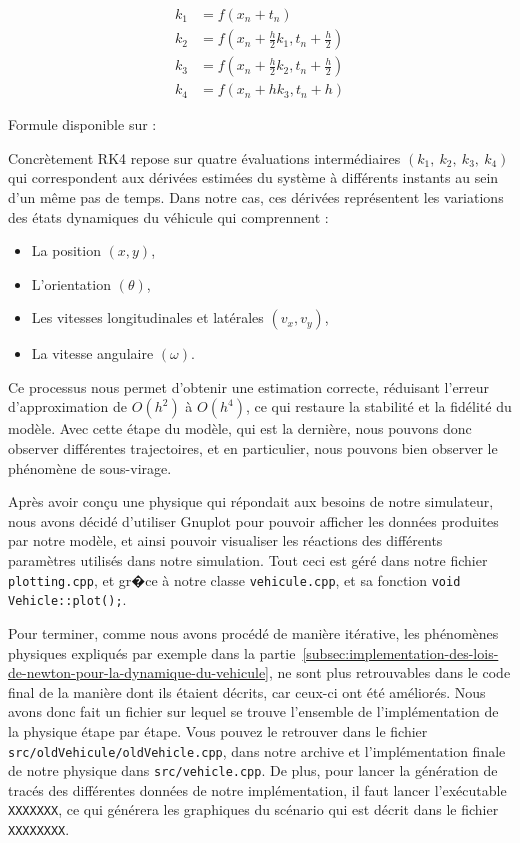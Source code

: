 \begin{align}
    k_1 &= f(x_n+t_n)\\
    k_2 &= f(x_n+ {\frac{h}{2}}k_1, t_n + {\frac{h}{2}})\\
    k_3 &= f(x_n+ {\frac{h}{2}}k_2, t_n + {\frac{h}{2}})\\
    k_4 &= f(x_n+ hk_3, t_n + h)
\end{align}
\begin{center}
    Formule disponible sur : \cite{RK4}
\end{center}
Concrètement RK4 repose sur quatre évaluations intermédiaires $(k_1, \ k_2, \ k_3, \ k_4)$ qui correspondent aux
dérivées estimées du système à différents instants au sein d'un même pas de temps.
Dans notre cas, ces dérivées
représentent les variations des états dynamiques du véhicule qui comprennent :

\begin{itemize}
    \item La position $(x,y)$,
    \item L'orientation $(\theta)$,
    \item Les vitesses longitudinales et latérales $(v_x, v_y)$,
    \item La vitesse angulaire $(\omega)$.
\end{itemize}

Ce processus nous permet d'obtenir une estimation correcte, réduisant l'erreur d'approximation de $O(h^2)$ à $O(h^4)$, ce qui restaure la stabilité et la fidélité du modèle.
Avec cette étape du modèle, qui est la dernière, nous pouvons donc observer différentes trajectoires, et en particulier, nous pouvons bien observer le phénomène de sous-virage.

Après avoir conçu une physique qui répondait aux besoins de notre simulateur, nous avons décidé d'utiliser \gls{Gnuplot} pour pouvoir afficher les données produites par notre modèle, et ainsi pouvoir visualiser les réactions des différents paramètres utilisés dans notre simulation.
Tout ceci est géré dans notre fichier \texttt{plotting.cpp}, et gr�ce à notre classe \texttt{vehicule.cpp}, et sa fonction \texttt{void Vehicle::plot();}.

Pour terminer, comme nous avons procédé de manière itérative, les phénomènes physiques expliqués par exemple dans la partie~\ref{subsec:implementation-des-lois-de-newton-pour-la-dynamique-du-vehicule}, ne sont plus retrouvables dans le code final de la manière dont ils étaient décrits, car ceux-ci ont été améliorés.
Nous avons donc fait un fichier sur lequel se trouve l'ensemble de l'implémentation de la physique étape par étape.
Vous pouvez le retrouver dans le fichier \texttt{src/oldVehicule/oldVehicle.cpp}, dans notre archive et l'implémentation finale de notre physique dans \texttt{src/vehicle.cpp}.
De plus, pour lancer la génération de tracés des différentes données de notre implémentation, il faut lancer l'exécutable \texttt{XXXXXXX}, ce qui générera les graphiques du scénario qui est décrit dans le fichier \texttt{XXXXXXXX}.
